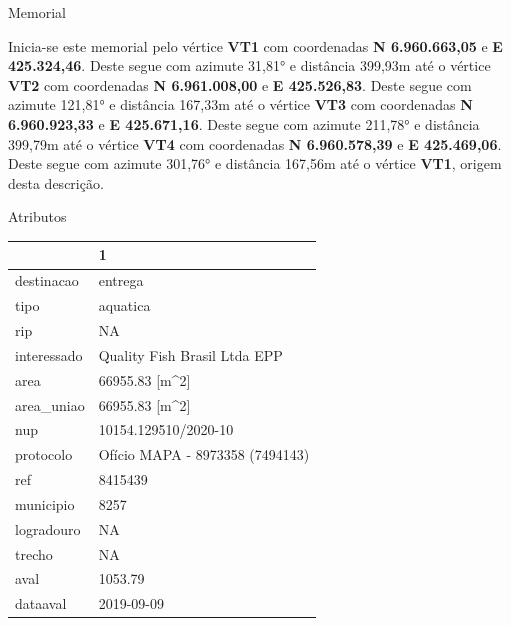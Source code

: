 \documentclass[ignorenonframetext,]{beamer}
\begin{document}
\begin{frame}{Memorial}
\protect\hypertarget{memorial}{}

\tiny Inicia-se este memorial pelo vértice \textbf{VT1} com coordenadas
\textbf{N 6.960.663,05} e \textbf{E 425.324,46}. Deste segue com azimute
31,81° e distância 399,93m até o vértice \textbf{VT2} com coordenadas
\textbf{N 6.961.008,00} e \textbf{E 425.526,83}. Deste segue com azimute
121,81° e distância 167,33m até o vértice \textbf{VT3} com coordenadas
\textbf{N 6.960.923,33} e \textbf{E 425.671,16}. Deste segue com azimute
211,78° e distância 399,79m até o vértice \textbf{VT4} com coordenadas
\textbf{N 6.960.578,39} e \textbf{E 425.469,06}. Deste segue com azimute
301,76° e distância 167,56m até o vértice \textbf{VT1}, origem desta
descrição.

\end{frame}

\begin{frame}{Atributos}
\protect\hypertarget{atributos}{}

\begin{table}[H]
\centering\begingroup\fontsize{8}{10}\selectfont

\begin{tabular}{ll}
\toprule
  & 1\\
\midrule
destinacao & entrega\\
tipo & aquatica\\
rip & NA\\
interessado & Quality Fish Brasil Ltda EPP\\
area & 66955.83 [m\textasciicircum{}2]\\
\addlinespace
area\_uniao & 66955.83 [m\textasciicircum{}2]\\
nup & 10154.129510/2020-10\\
protocolo & Ofício MAPA - 8973358 (7494143)\\
ref & 8415439\\
municipio & 8257\\
\addlinespace
logradouro & NA\\
trecho & NA\\
aval & 1053.79\\
dataaval & 2019-09-09\\
\bottomrule
\end{tabular}
\endgroup{}
\end{table}

\end{frame}
\end{document}
